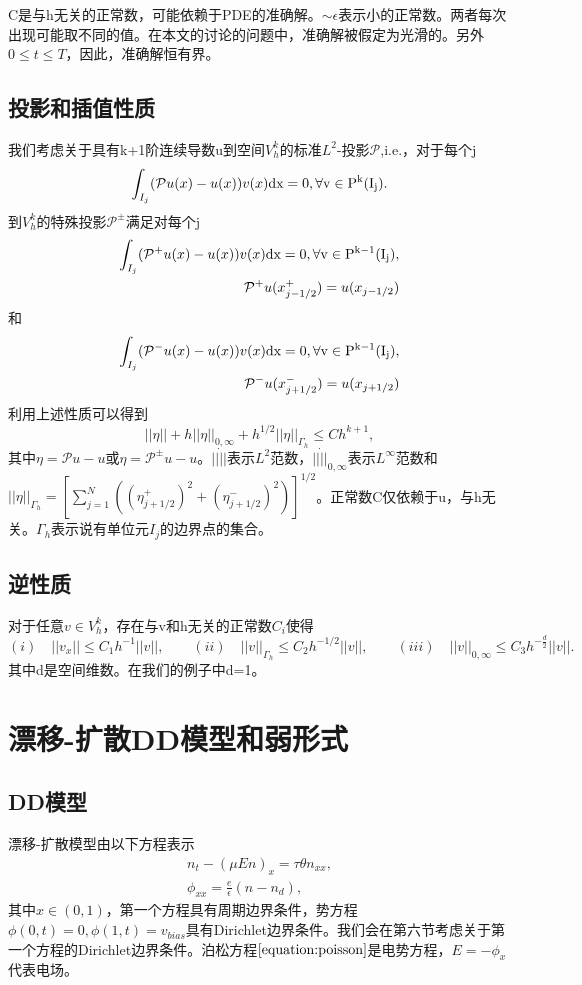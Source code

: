 \documentclass[lang=cn,newtx,10pt,scheme=chinese]{elegantbook}
\begin{document}
C是与h无关的正常数，可能依赖于PDE的准确解。$\sim{\epsilon}$表示小的正常数。两者每次出现可能取不同的值。在本文的讨论的问题中，准确解被假定为光滑的。另外$0\leq t \leq T$，因此，准确解恒有界。
\section{投影和插值性质}
我们考虑关于具有k+1阶连续导数u到空间$V_h^k$的标准$L^2$-投影$\mathcal{P}$,i.e.，对于每个j
\begin{equation*}
    \int_{I_j}(\mathcal{P}u(x) - u(x))v(x)\rm{d} x = 0, \forall v \in P^k(I_j).
\end{equation*}
到$V_h^k$的特殊投影$\mathcal{P}^{\pm}$满足对每个j
\begin{align*}
    \int_{I_j}(\mathcal{P}^+u(x) - u(x))v(x)\rm{d} x = 0, \forall v \in P^{k-1}(I_j), \\
    \mathcal{P}^+u(x_{j-1/2}^+) = u(x_{j-1/2})
\end{align*}
和
\begin{align*}
    \int_{I_j}(\mathcal{P}^-u(x) - u(x))v(x)\rm{d} x = 0, \forall v \in P^{k-1}(I_j), \\
    \mathcal{P}^-u(x_{j+1/2}^-) = u(x_{j+1/2})
\end{align*}
利用上述性质可以得到
\begin{equation}
    ||\eta|| + h||\eta||_{0,\infty} + h^{1/2}||\eta||_{\Gamma_h} \leq Ch^{k+1},
\end{equation}
其中$\eta = \mathcal{P}u - u$或$\eta = \mathcal{P}^{\pm}u - u$。$||\dot||$表示$L^2$范数，$||\dot||_{0,\infty}$表示$L^{\infty}$范数和$||\eta||_{\Gamma_h} = [\sum_{j=1}^{N}((\eta_{j+1/2}^+)^2 + (\eta_{j+1/2}^-)^2)]^{1/2}$。正常数C仅依赖于u，与h无关。$\Gamma_h$表示说有单位元$I_j$的边界点的集合。
\section{逆性质}
对于任意$v \in V_h^k$，存在与v和h无关的正常数$C_i$使得
\begin{equation}
    (i)\quad  ||v_x|| \leq C_1 h^{-1} ||v||, \qquad
    (ii)\quad||v||_{\Gamma_h} \leq C_2 h^{-1/2}||v||, \qquad
    (iii)\quad ||v||_{0,\infty} \leq C_3 h^{-\frac{d}{2}}||v||.
\end{equation}
其中d是空间维数。在我们的例子中d=1。
\chapter{漂移-扩散DD模型和弱形式}
\section{DD模型}
漂移-扩散模型由以下方程表示
\begin{align}
    n_t - (\mu En)_x = \tau \theta n_{xx}, \label{equation:DD} \\
    \phi_{xx} = \frac{e}{\epsilon}(n - n_d),  \label{equation:poisson}
\end{align}
其中$x \in (0,1)$，第一个方程具有周期边界条件，势方程$\phi(0,t) = 0, \phi(1,t) = v_{bias}$具有Dirichlet边界条件。我们会在第六节考虑关于第一个方程的Dirichlet边界条件。泊松方程$\ref{equation:poisson}$是电势方程，$E = -\phi_x$代表电场。
\end{document}
